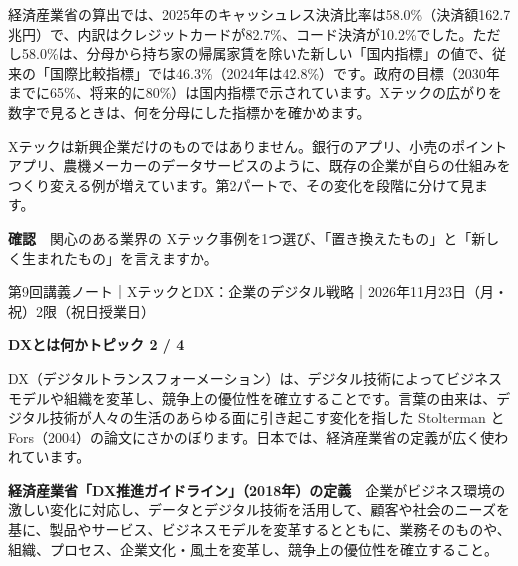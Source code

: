 \documentclass[paper=a4paper,fontsize=10pt,line_length=170mm,number_of_lines=46,baselineskip=1.6zw]{jlreq}
\newcommand\topichead[4]{%
  {\sffamily\footnotesize\color{grayt}#1\par}\vspace{1.5mm}
  {\sffamily\bfseries\LARGE #4}\hfill\colorbox{accent}{\sffamily\footnotesize\bfseries トピック #2 / #3}\par
  \vspace{1.2mm}{\color{ink}\hrule height 0.6pt}\vspace{3mm}}
\newcommand\subhead[1]{\par\vspace{2.6mm}{\sffamily\bfseries\large #1}\par\vspace{1.3mm}}
\begin{document}
\subhead{FinTech に見る「数字の読み方」}
経済産業省の算出では、2025年のキャッシュレス決済比率は58.0\%（決済額162.7兆円）で、内訳はクレジットカードが82.7\%、コード決済が10.2\%でした。ただし58.0\%は、分母から持ち家の帰属家賃を除いた新しい「国内指標」の値で、従来の「国際比較指標」では46.3\%（2024年は42.8\%）です。政府の目標（2030年までに65\%、将来的に80\%）は国内指標で示されています。Xテックの広がりを数字で見るときは、何を分母にした指標かを確かめます。\par\vspace{1.2mm}
\subhead{既存の企業も Xテックの担い手}
Xテックは新興企業だけのものではありません。銀行のアプリ、小売のポイントアプリ、農機メーカーのデータサービスのように、既存の企業が自らの仕組みをつくり変える例が増えています。第2パートで、その変化を段階に分けて見ます。\par\vspace{1.2mm}
\begin{checkbox}
{\sffamily\bfseries 確認}　関心のある業界の Xテック事例を1つ選び、「置き換えたもの」と「新しく生まれたもの」を言えますか。\par
\end{checkbox}
\clearpage
\topichead{第9回講義ノート｜XテックとDX：企業のデジタル戦略｜2026年11月23日（月・祝）2限（祝日授業日）}{2}{4}{DXとは何か}
DX（デジタルトランスフォーメーション）は、デジタル技術によってビジネスモデルや組織を変革し、競争上の優位性を確立することです。言葉の由来は、デジタル技術が人々の生活のあらゆる面に引き起こす変化を指した Stolterman と Fors（2004）の論文にさかのぼります。日本では、経済産業省の定義が広く使われています。\par\vspace{1.2mm}
\begin{hintbox}
{\sffamily\bfseries 経済産業省「DX推進ガイドライン」（2018年）の定義}　企業がビジネス環境の激しい変化に対応し、データとデジタル技術を活用して、顧客や社会のニーズを基に、製品やサービス、ビジネスモデルを変革するとともに、業務そのものや、組織、プロセス、企業文化・風土を変革し、競争上の優位性を確立すること。\par
\end{hintbox}
\subhead{3つの段階}
\end{document}
